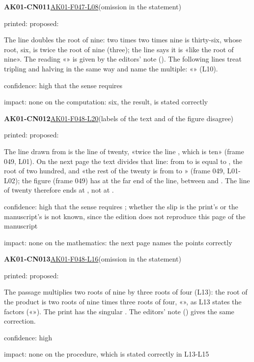 \documentclass[11pt]{article}
\begin{document}
\noindent\textbf{AK01-CN011}\enspace\hyperlink{AK01-F047-L08}{AK01-F047-L08}\enspace(omission in the statement)\par\noindent printed: \enspace proposed: \par\noindent The line doubles the root of nine: two times two times nine is thirty-six, whose root, six, is twice the root of nine (three); the line says it is «like the root of nine». The reading «» is given by the editors' note (). The following lines treat tripling and halving in the same way and name the multiple: «» (L10).\par\noindent confidence: high that the sense requires \par\noindent impact: none on the computation: six, the result, is stated correctly\par\medskip
\noindent\textbf{AK01-CN012}\enspace\hyperlink{AK01-F048-L20}{AK01-F048-L20}\enspace(labels of the text and of the figure disagree)\par\noindent printed: \enspace proposed: \par\noindent The line drawn from  is the line of twenty, «twice the line , which is ten» (frame 049, L01). On the next page the text divides that line: from  to  is equal to , the root of two hundred, and «the rest of the twenty is from  to » (frame 049, L01-L02); the figure (frame 049) has  at the far end of the line,  between  and . The line of twenty therefore ends at , not at .\par\noindent confidence: high that the sense requires ; whether the slip is the print's or the manuscript's is not known, since the edition does not reproduce this page of the manuscript\par\noindent impact: none on the mathematics: the next page names the points correctly\par\medskip
\noindent\textbf{AK01-CN013}\enspace\hyperlink{AK01-F048-L16}{AK01-F048-L16}\enspace(omission in the statement)\par\noindent printed: \enspace proposed: \par\noindent The passage multiplies two roots of nine by three roots of four (L13): the root of the product is two roots of nine times three roots of four, «», as L13 states the factors («»). The print has the singular . The editors' note () gives the same correction.\par\noindent confidence: high\par\noindent impact: none on the procedure, which is stated correctly in L13-L15\par\medskip
\end{document}

